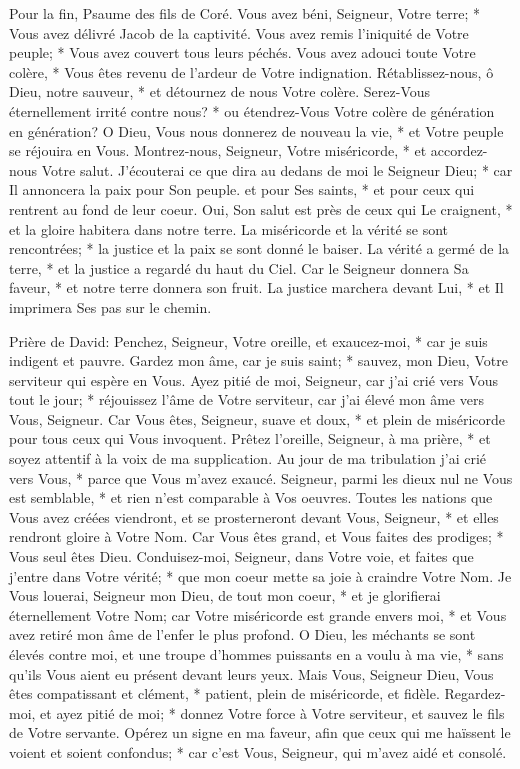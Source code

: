 Pour la fin, Psaume des fils de Coré.
Vous avez béni, Seigneur, Votre terre; * Vous avez délivré Jacob de la captivité.
Vous avez remis l'iniquité de Votre peuple; * Vous avez couvert tous leurs péchés.
Vous avez adouci toute Votre colère, * Vous êtes revenu de l'ardeur de Votre indignation.
Rétablissez-nous, ô Dieu, notre sauveur, * et détournez de nous Votre colère.
Serez-Vous éternellement irrité contre nous? * ou étendrez-Vous Votre colère de génération en génération?
O Dieu, Vous nous donnerez de nouveau la vie, * et Votre peuple se réjouira en Vous.
Montrez-nous, Seigneur, Votre miséricorde, * et accordez-nous Votre salut.
J'écouterai ce que dira au dedans de moi le Seigneur Dieu; * car Il annoncera la paix pour Son peuple. et pour Ses saints, * et pour ceux qui rentrent au fond de leur coeur.
Oui, Son salut est près de ceux qui Le craignent, * et la gloire habitera dans notre terre.
La miséricorde et la vérité se sont rencontrées; * la justice et la paix se sont donné le baiser.
La vérité a germé de la terre, * et la justice a regardé du haut du Ciel.
Car le Seigneur donnera Sa faveur, * et notre terre donnera son fruit.
La justice marchera devant Lui, * et Il imprimera Ses pas sur le chemin.

Prière de David: Penchez, Seigneur, Votre oreille, et exaucez-moi, * car je suis indigent et pauvre.
Gardez mon âme, car je suis saint; * sauvez, mon Dieu, Votre serviteur qui espère en Vous.
Ayez pitié de moi, Seigneur, car j'ai crié vers Vous tout le jour; *
réjouissez l'âme de Votre serviteur, car j'ai élevé mon âme vers Vous, Seigneur.
Car Vous êtes, Seigneur, suave et doux, * et plein de miséricorde pour tous ceux qui Vous invoquent.
Prêtez l'oreille, Seigneur, à ma prière, * et soyez attentif à la voix de ma supplication.
Au jour de ma tribulation j'ai crié vers Vous, * parce que Vous m'avez exaucé.
Seigneur, parmi les dieux nul ne Vous est semblable, * et rien n'est comparable à Vos oeuvres.
Toutes les nations que Vous avez créées viendront, et se prosterneront devant Vous, Seigneur, * et elles rendront gloire à Votre Nom.
Car Vous êtes grand, et Vous faites des prodiges; * Vous seul êtes Dieu.
Conduisez-moi, Seigneur, dans Votre voie, et faites que j'entre dans Votre vérité; * que mon coeur mette sa joie à craindre Votre Nom.
Je Vous louerai, Seigneur mon Dieu, de tout mon coeur, * et je glorifierai éternellement Votre Nom;
car Votre miséricorde est grande envers moi, * et Vous avez retiré mon âme de l'enfer le plus profond.
O Dieu, les méchants se sont élevés contre moi, et une troupe d'hommes puissants en a voulu à ma vie, * sans qu'ils Vous aient eu présent devant leurs yeux.
Mais Vous, Seigneur Dieu, Vous êtes compatissant et clément, * patient, plein de miséricorde, et fidèle.
Regardez-moi, et ayez pitié de moi; * donnez Votre force à Votre serviteur, et sauvez le fils de Votre servante.
Opérez un signe en ma faveur, afin que ceux qui me haïssent le voient et soient confondus; * car c'est Vous, Seigneur, qui m'avez aidé et consolé.

